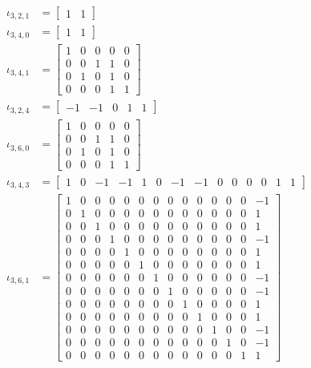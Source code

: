 \documentclass{amsart}
\begin{document}
\begin{align*} 
\iota_{3,2,1}&=  
\begin{bmatrix}
  1 & 1
\end{bmatrix}\\
\iota_{3,4,0}&=  
\begin{bmatrix}
  1 & 1
\end{bmatrix}\\
\iota_{3,4,1}&=  
\begin{bmatrix}
  1 & 0 & 0 & 0 & 0\\
  0 & 0 & 1 & 1 & 0\\
  0 & 1 & 0 & 1 & 0\\
  0 & 0 & 0 & 1 & 1
\end{bmatrix}\\
\iota_{3,2,4}&=  
\begin{bmatrix}
  -1 & -1 & 0 & 1 & 1
\end{bmatrix}\\
\iota_{3,6,0}&=  
\begin{bmatrix}
  1 & 0 & 0 & 0 & 0\\
  0 & 0 & 1 & 1 & 0\\
  0 & 1 & 0 & 1 & 0\\
  0 & 0 & 0 & 1 & 1
\end{bmatrix}\\
\iota_{3,4,3}&=  
\begin{bmatrix}
 1 & 0 &-1 &-1 & 1 & 0 & -1 & -1 & 0 & 0 & 0 & 0 & 1 & 1
\end{bmatrix}\\
\iota_{3,6,1}&=  
\begin{bmatrix}
 1 & 0 & 0 & 0 & 0 & 0 & 0 & 0 & 0 & 0 & 0 & 0 & 0 &-1\\
 0 & 1 & 0 & 0 & 0 & 0 & 0 & 0 & 0 & 0 & 0 & 0 & 0 & 1\\
 0 & 0 & 1 & 0 & 0 & 0 & 0 & 0 & 0 & 0 & 0 & 0 & 0 & 1\\
 0 & 0 & 0 & 1 & 0 & 0 & 0 & 0 & 0 & 0 & 0 & 0 & 0 &-1\\
 0 & 0 & 0 & 0 & 1 & 0 & 0 & 0 & 0 & 0 & 0 & 0 & 0 & 1\\
 0 & 0 & 0 & 0 & 0 & 1 & 0 & 0 & 0 & 0 & 0 & 0 & 0 & 1\\
 0 & 0 & 0 & 0 & 0 & 0 & 1 & 0 & 0 & 0 & 0 & 0 & 0 &-1\\
 0 & 0 & 0 & 0 & 0 & 0 & 0 & 1 & 0 & 0 & 0 & 0 & 0 &-1\\
 0 & 0 & 0 & 0 & 0 & 0 & 0 & 0 & 1 & 0 & 0 & 0 & 0 & 1\\
 0 & 0 & 0 & 0 & 0 & 0 & 0 & 0 & 0 & 1 & 0 & 0 & 0 & 1\\
 0 & 0 & 0 & 0 & 0 & 0 & 0 & 0 & 0 & 0 & 1 & 0 & 0 &-1\\
 0 & 0 & 0 & 0 & 0 & 0 & 0 & 0 & 0 & 0 & 0 & 1 & 0 &-1\\
 0 & 0 & 0 & 0 & 0 & 0 & 0 & 0 & 0 & 0 & 0 & 0 & 1 & 1
\end{bmatrix}
\end{align*}
\end{document}
